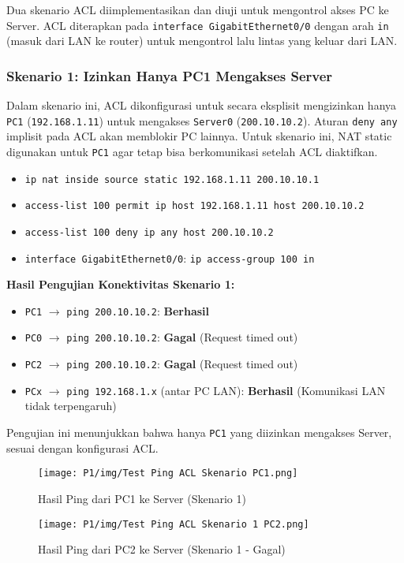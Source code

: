 Dua skenario ACL diimplementasikan dan diuji untuk mengontrol akses PC ke Server. ACL diterapkan pada \texttt{interface GigabitEthernet0/0} dengan arah \texttt{in} (masuk dari LAN ke router) untuk mengontrol lalu lintas yang keluar dari LAN.

\subsubsection*{Skenario 1: Izinkan Hanya PC1 Mengakses Server}
Dalam skenario ini, ACL dikonfigurasi untuk secara eksplisit mengizinkan hanya \texttt{PC1} (\texttt{192.168.1.11}) untuk mengakses \texttt{Server0} (\texttt{200.10.10.2}). Aturan \texttt{deny any} implisit pada ACL akan memblokir PC lainnya. Untuk skenario ini, NAT static digunakan untuk \texttt{PC1} agar tetap bisa berkomunikasi setelah ACL diaktifkan.

\begin{itemize}
    \item \texttt{ip nat inside source static 192.168.1.11 200.10.10.1}
    \item \texttt{access-list 100 permit ip host 192.168.1.11 host 200.10.10.2}
    \item \texttt{access-list 100 deny ip any host 200.10.10.2}
    \item \texttt{interface GigabitEthernet0/0}: \texttt{ip access-group 100 in}
\end{itemize}

\textbf{Hasil Pengujian Konektivitas Skenario 1:}
\begin{itemize}
    \item \texttt{PC1} $\rightarrow$ \texttt{ping 200.10.10.2}: \textbf{Berhasil}
    \item \texttt{PC0} $\rightarrow$ \texttt{ping 200.10.10.2}: \textbf{Gagal} (Request timed out)
    \item \texttt{PC2} $\rightarrow$ \texttt{ping 200.10.10.2}: \textbf{Gagal} (Request timed out)
    \item \texttt{PCx} $\rightarrow$ \texttt{ping 192.168.1.x} (antar PC LAN): \textbf{Berhasil} (Komunikasi LAN tidak terpengaruh)
\end{itemize}
Pengujian ini menunjukkan bahwa hanya \texttt{PC1} yang diizinkan mengakses Server, sesuai dengan konfigurasi ACL.

\begin{figure}[H]
    \centering
    \begin{minipage}[t]{0.48\textwidth}
        \centering
        \texttt{[image: P1/img/Test Ping ACL Skenario PC1.png]}
        \caption{Hasil Ping dari PC1 ke Server (Skenario 1)}
        \label{fig:ping_acl1_pc1}
    \end{minipage}
    \hfill
    \begin{minipage}[t]{0.48\textwidth}
        \centering
        \texttt{[image: P1/img/Test Ping ACL Skenario 1 PC2.png]}
        \caption{Hasil Ping dari PC2 ke Server (Skenario 1 - Gagal)}
        \label{fig:ping_acl1_pc2}
    \end{minipage}
\end{figure}

